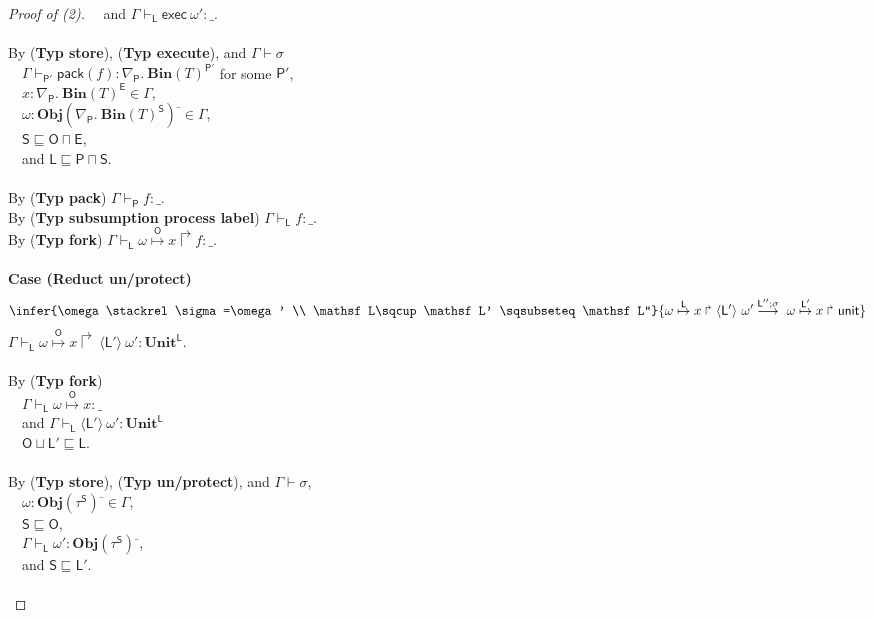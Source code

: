 \documentclass{sigplanconf}
\newcommand{\lab}{\mathsf L}
\newcommand{\labp}{\mathsf P}
\newcommand{\labo}{\mathsf O}
\newcommand{\labb}{\mathsf S}
\newcommand{\labt}{\mathsf E}
\newcommand{\action}[1]{\stackrel{#1}{\longrightarrow}~}
\newcommand{\fork}[2]{#1\Rsh\:\!#2}
\newcommand{\store}[1]{\stackrel{#1}\mapsto}
\newcommand{\trule}[1]{(\textbf{Typ #1})}
\begin{document}
\begin{proof}[Proof of (2)]
$~~~$ and $\Gamma \vdash_\lab \mathsf{exec}~\omega' : \_$.\\
\\
By \trule{store}, \trule{execute}, and $\Gamma \vdash \sigma$\\
$~~~$ $\Gamma \vdash_{\labp'} \mathsf{pack}(f): \nabla_{\labp}.~\mathbf{Bin}(T)^{\labp'}$ for some $\labp'$,\\
$~~~$ $x : \nabla_{\labp}.~\mathbf{Bin}(T)^{\labt} \in \Gamma$,\\
$~~~$ $\omega: \mathbf{Obj}(\nabla_{\labp}.~\mathbf{Bin}(T)^{\labb})^\_ \in \Gamma$,\\
$~~~$ $\labb \sqsubseteq \labo \sqcap \labt$,\\
$~~~$ and $\lab \sqsubseteq \labp \sqcap \labb$. \\
\\
By \trule{pack} $\Gamma \vdash_{\labp} f: \_$.\\
By \trule{subsumption process label} $\Gamma \vdash_{\lab} f: \_$.\\
By \trule{fork} $\Gamma \vdash_{\lab} \omega \store{\labo} x  \Rsh f: \_$.\\
\\
{\bf Case (Reduct un/protect)}
$$\infer
    {\omega \stackrel\sigma=\omega' \\ \lab \sqcup \lab' \sqsubseteq \lab''}
    {\fork{\omega \store{\lab} x}\langle\lab'\rangle~\omega' \action{\lab'';\sigma} \fork{\omega \store{\lab'} x}\mathsf{unit}}
$$
$\Gamma \vdash_\lab \fork{\omega \store{\labo} x} \langle\lab'\rangle~\omega' : \mathbf{Unit}^\lab$.\\
\\
By \trule{fork}\\
$~~~$  $\Gamma \vdash_\lab \omega \store{\labo} x : \_$ \\
$~~~$ and $\Gamma \vdash_\lab \langle\lab'\rangle~\omega' : \mathbf{Unit}^\lab$\\
$~~~$ $\labo \sqcup \lab' \sqsubseteq \lab$.\\
\\
By \trule{store}, \trule{un/protect}, and $\Gamma \vdash \sigma$, \\
$~~~$ $\omega: \mathbf{Obj}(\tau^{\labb})^\_ \in \Gamma$,\\
$~~~$ $\labb \sqsubseteq \labo$, \\
$~~~$ $\Gamma \vdash_\lab \omega': \mathbf{Obj}(\tau^{\labb})^\_$,\\
$~~~$ and $\labb \sqsubseteq \lab'$. \\
\\

\end{proof}
\end{document}
